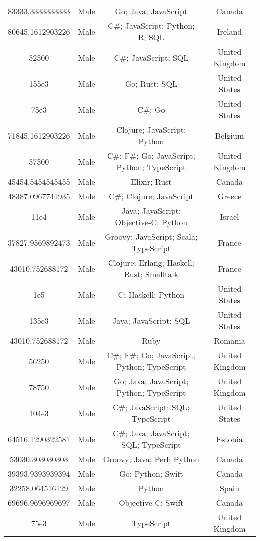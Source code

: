 \begin{center}
\begin{tabular}{ |c|c|c|c| }
83333.3333333333  &  Male  &  Go; Java; JavaScript  &  Canada  \\ 
80645.1612903226  &  Male  &  C\#; JavaScript; Python; R; SQL  &  Ireland  \\ 
52500  &  Male  &  C\#; JavaScript; SQL  &  United Kingdom  \\ 
155e3  &  Male  &  Go; Rust; SQL  &  United States  \\ 
75e3  &  Male  &  C\#; Go  &  United States  \\ 
71845.1612903226  &  Male  &  Clojure; JavaScript; Python  &  Belgium  \\ 
57500  &  Male  &  C\#; F\#; Go; JavaScript; Python; TypeScript  &  United Kingdom  \\ 
45454.5454545455  &  Male  &  Elixir; Rust  &  Canada  \\ 
48387.0967741935  &  Male  &  C\#; Clojure; JavaScript  &  Greece  \\ 
11e4  &  Male  &  Java; JavaScript; Objective-C; Python  &  Israel  \\ 
37827.9569892473  &  Male  &  Groovy; JavaScript; Scala; TypeScript  &  France  \\ 
43010.752688172  &  Male  &  Clojure; Erlang; Haskell; Rust; Smalltalk  &  France  \\ 
1e5  &  Male  &  C; Haskell; Python  &  United States  \\ 
135e3  &  Male  &  Java; JavaScript; SQL  &  United States  \\ 
43010.752688172  &  Male  &  Ruby  &  Romania  \\ 
56250  &  Male  &  C\#; F\#; Go; JavaScript; Python; TypeScript  &  United Kingdom  \\ 
78750  &  Male  &  Go; Java; JavaScript; Python; TypeScript  &  United Kingdom  \\ 
104e3  &  Male  &  C\#; JavaScript; SQL; TypeScript  &  United States  \\ 
64516.1290322581  &  Male  &  C\#; Java; JavaScript; SQL; TypeScript  &  Estonia  \\ 
53030.303030303  &  Male  &  Groovy; Java; Perl; Python  &  Canada  \\ 
39393.9393939394  &  Male  &  Go; Python; Swift  &  Canada  \\ 
32258.064516129  &  Male  &  Python  &  Spain  \\ 
69696.9696969697  &  Male  &  Objective-C; Swift  &  Canada  \\ 
75e3  &  Male  &  TypeScript  &  United Kingdom  \\ 

\end{tabular}
\end{center}
